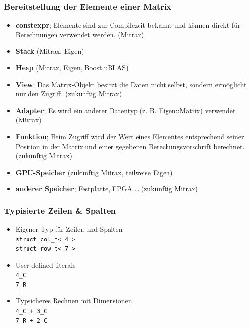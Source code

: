 \documentclass{beamer}
\newcommand{\cmark}{\ding{51}}
\newcommand{\xmark}{\ding{55}}
\begin{document}
\begin{frame}
    \frametitle{Bereitstellung der Elemente einer Matrix}
    \begin{itemize}
        \item \textbf{constexpr}; Elemente sind zur Compilezeit bekannt und können direkt für Berechnungen verwendet werden. (Mitrax)
        \item \textbf{Stack} (Mitrax, Eigen)
        \item \textbf{Heap} (Mitrax, Eigen, Boost.uBLAS)
        \item \textbf{View}; Das Matrix-Objekt besitzt die Daten nicht selbst, sondern ermöglicht nur den Zugriff. (zukünftig Mitrax)
        \item \textbf{Adapter}; Es wird ein anderer Datentyp (z. B. Eigen::Matrix) verwendet (Mitrax)
        \item \textbf{Funktion}; Beim Zugriff wird der Wert eines Elementes entsprechend seiner Position in der Matrix und einer gegebenen Berechungsvorschrift berechnet. (zukünftig Mitrax)
        \item \textbf{GPU-Speicher} (zukünftig Mitrax, teilweise Eigen)
        \item \textbf{anderer Speicher}; Festplatte, FPGA … (zukünftig Mitrax)
    \end{itemize}
\end{frame}
\begin{frame}
    \frametitle{Typisierte Zeilen \& Spalten}
    \begin{itemize}
        \item Eigener Typ für Zeilen und Spalten \\
            \hspace{1em}\texttt{struct col\_t< 4 >} \\
            \hspace{1em}\texttt{struct row\_t< 7 >}
        \item User-defined literals \\
        \hspace{1em}\texttt{4\_C} \\
        \hspace{1em}\texttt{7\_R}
        \item Typsicheres Rechnen mit Dimensionen \\
        \hspace{1em}\texttt{4\_C + 3\_C \cmark} \\
        \hspace{1em}\texttt{7\_R + 2\_C \xmark}
    \end{itemize}
\end{frame}
\end{document}
